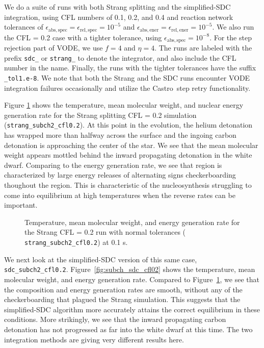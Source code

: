 \documentclass[linenumbers,trackchanges]{aastex631}
\newcommand{\castro}{{\sf Castro}}
\newcommand{\atolspec}{{\epsilon_\mathrm{abs,spec}}}
\newcommand{\rtolspec}{{\epsilon_\mathrm{rel,spec}}}
\newcommand{\atolener}{{\epsilon_\mathrm{abs,ener}}}
\newcommand{\rtolener}{{\epsilon_\mathrm{rel,ener}}}
\begin{document}
We do a suite of runs with both Strang splitting and the simplified-SDC integration, using
CFL numbers of 0.1, 0.2, and 0.4 and reaction network tolerances of $\atolspec =
\rtolspec = 10^{-5}$ and $\atolener = \rtolener = 10^{-5}$.  We also run the CFL
= 0.2 case with a tighter tolerance, using  $\atolspec = 10^{-8}$.  For the step
rejection part of VODE, we use $f = 4$ and $\eta = 4$.  The runs are labeled with
the prefix {\tt sdc\_} or {\tt strang\_} to denote the integrator, and also include
the CFL number in the name.  Finally, the runs with the tighter tolerances have
the suffix {\tt \_tol1.e-8}.  We note that both the Strang and the SDC runs encounter
VODE integration failures occasionally and utilize the \castro\ step retry functionality.

Figure \ref{fig:subch_strang_cfl02} shows the temperature, mean
molecular weight, and nuclear energy generation rate for the Strang splitting
CFL = 0.2 simulation ({\tt strang\_subch2\_cfl0.2}).  At this point
in the evolution, the helium detonation has wrapped more than halfway
across the surface and the ingoing carbon detonation is approaching the
center of the star.  We see that the
mean molecular weight appears mottled behind the inward propagating
detonation in the white dwarf.  Comparing to the energy generation
rate, we see that region is characterized by large energy releases of
alternating signs checkerboarding thoughout the region.  This is
characteristic of the nucleosynthesis struggling to come into
equilibrium at high temperatures when the reverse rates can be
important.

\begin{figure}
\centering
{}
\caption{\label{fig:subch_strang_cfl02} Temperature, mean molecular weight, and
energy generation rate for the Strang CFL = 0.2 run with normal tolerances ({\tt
strang\_subch2\_cfl0.2}) at 0.1 s.}
\end{figure}

We next look at the simplified-SDC version of this same case, {\tt
sdc\_subch2\_cfl0.2}.  Figure~\ref{fig:subch_sdc_cfl02} shows the temperature,
mean molecular weight, and energy generation rate. Compared to
Figure~\ref{fig:subch_strang_cfl02}, we see that the composition and energy
generation rates are smooth, without any of the checkerboarding that plagued the
Strang simulation.  This suggests that the simplified-SDC algorithm more accurately
attains the correct equilibrium in these conditions. More
strikingly, we see that the inward propagating carbon detonation has not
progressed as far into the white dwarf at this time.  The two integration
methods are giving very different results here.
\end{document}
